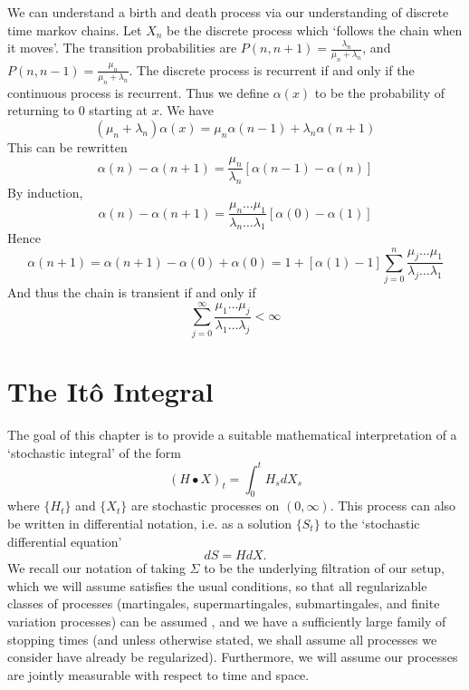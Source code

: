 We can understand a birth and death process via our understanding of discrete time markov chains. Let $X_n$ be the discrete process which `follows the chain when it moves'. The transition probabilities are $P(n,n+1) = \frac{\lambda_n}{\mu_n + \lambda_n}$, and $P(n,n-1) = \frac{\mu_n}{\mu_n + \lambda_n}$. The discrete process is recurrent if and only if the continuous process is recurrent. Thus we define $\alpha(x)$ to be the probability of returning to 0 starting at $x$. We have
%
\[ (\mu_n + \lambda_n) \alpha(x) = \mu_n \alpha(n-1) + \lambda_n \alpha(n+1) \]
%
This can be rewritten
%
\[ \alpha(n) - \alpha(n+1) = \frac{\mu_n}{\lambda_n} [\alpha(n-1) - \alpha(n)] \]
%
By induction,
%
\[ \alpha(n) - \alpha(n+1) = \frac{\mu_n \dots \mu_1}{\lambda_n \dots \lambda_1} [\alpha(0) - \alpha(1)] \]
%
Hence
%
\[ \alpha(n+1) = \alpha(n+1) - \alpha(0) + \alpha(0) = 1 + [\alpha(1) - 1] \sum_{j = 0}^n \frac{\mu_j \dots \mu_1}{\lambda_j \dots \lambda_1} \]
%
And thus the chain is transient if and only if
%
\[ \sum_{j = 0}^\infty \frac{\mu_1 \dots \mu_j}{\lambda_1 \dots \lambda_j} < \infty \]




\chapter{The It\^{o} Integral}

The goal of this chapter is to provide a suitable mathematical interpretation of a `stochastic integral' of the form
%
\[ (H \bullet X)_t = \int_0^t H_s dX_s \]
%
where $\{ H_t \}$ and $\{ X_t \}$ are stochastic processes on $(0,\infty)$. This process can also be written in differential notation, i.e. as a solution $\{ S_t \}$ to the `stochastic differential equation'
%
\[ dS = H dX. \]
%
We recall our notation of taking $\Sigma$ to be the underlying filtration of our setup, which we will assume satisfies the usual conditions, so that all regularizable classes of processes (martingales, supermartingales, submartingales, and finite variation processes) can be assumed \cadlag, and we have a sufficiently large family of stopping times (and unless otherwise stated, we shall assume all processes we consider have already be regularized). Furthermore, we will assume our processes are jointly measurable with respect to time and space.

